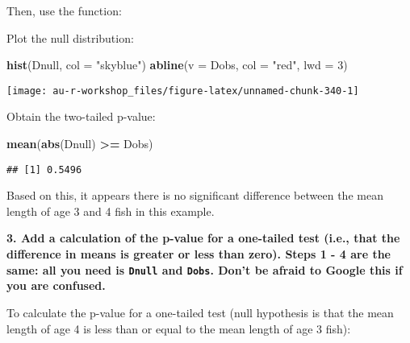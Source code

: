 \documentclass[]{book}
\newenvironment{Shaded}{\begin{snugshade}}{\end{snugshade}}
\newcommand{\KeywordTok}[1]{\textcolor[rgb]{0.13,0.29,0.53}{\textbf{#1}}}
\newcommand{\DataTypeTok}[1]{\textcolor[rgb]{0.13,0.29,0.53}{#1}}
\newcommand{\DecValTok}[1]{\textcolor[rgb]{0.00,0.00,0.81}{#1}}
\newcommand{\StringTok}[1]{\textcolor[rgb]{0.31,0.60,0.02}{#1}}
\newcommand{\OperatorTok}[1]{\textcolor[rgb]{0.81,0.36,0.00}{\textbf{#1}}}
\newcommand{\NormalTok}[1]{#1}
\theoremstyle{definition}
\theoremstyle{definition}
\theoremstyle{definition}
\theoremstyle{remark}
\begin{document}
Then, use the function:

\begin{Shaded}
\end{Shaded}

Plot the null distribution:

\begin{Shaded}
\begin{Highlighting}[]
\KeywordTok{hist}\NormalTok{(Dnull, }\DataTypeTok{col =} \StringTok{"skyblue"}\NormalTok{)}
\KeywordTok{abline}\NormalTok{(}\DataTypeTok{v =}\NormalTok{ Dobs, }\DataTypeTok{col =} \StringTok{"red"}\NormalTok{, }\DataTypeTok{lwd =} \DecValTok{3}\NormalTok{)}
\end{Highlighting}
\end{Shaded}

\begin{center}\texttt{[image: au-r-workshop\_files/figure-latex/unnamed-chunk-340-1]} \end{center}

Obtain the two-tailed p-value:

\begin{Shaded}
\begin{Highlighting}[]
\KeywordTok{mean}\NormalTok{(}\KeywordTok{abs}\NormalTok{(Dnull) }\OperatorTok{>=}\StringTok{ }\NormalTok{Dobs)}
\end{Highlighting}
\end{Shaded}

\begin{verbatim}
## [1] 0.5496
\end{verbatim}

Based on this, it appears there is no significant difference between the
mean length of age 3 and 4 fish in this example.

\textbf{3. Add a calculation of the p-value for a one-tailed test (i.e.,
that the difference in means is greater or less than zero). Steps 1 - 4
are the same: all you need is \texttt{Dnull} and \texttt{Dobs}. Don't be
afraid to Google this if you are confused.}

To calculate the p-value for a one-tailed test (null hypothesis is that
the mean length of age 4 is less than or equal to the mean length of age
3 fish):
\end{document}
